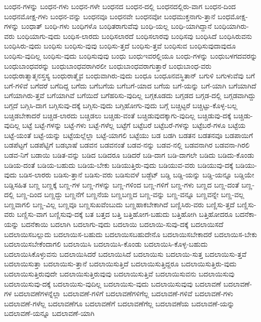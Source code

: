 {ಬಂಧನ-ಗಳನ್ನು
ಬಂಧನ-ಗಳು
ಬಂಧನ-ಗಳೇ
ಬಂಧನದ
ಬಂಧನ-ದಲ್ಲಿ
ಬಂಧನದಲ್ಲಿರು-ವಾಗ
ಬಂಧನ-ದಿಂದ
ಬಂಧನಮೋಕ್ಷ-ಗಳು
ಬಂಧನ-ವನ್ನು
ಬಂಧನವೂ
ಬಂಧನವೇ
ಬಂಧನವೋ
ಬಂಧಮುಕ್ತನಾಗು-ತ್ತಾನೆ
ಬಂಧಮೋಕ್ಷ-ಗಳನ್ನು
ಬಂಧಾತ್
ಬಂಧಿ-ಗಳು
ಬಂಧಿಗಳೊ
ಬಂಧಿತರಾಗುವೆವು
ಬಂಧಿ-ಯಲ್ಲ
ಬಂಧಿ-ಯಾಗಿದ್ದಾನೆ
ಬಂಧಿಯಾಗಿರು-ವರು
ಬಂಧಿಯಾಗು-ವುದು
ಬಂಧಿಸ-ಲಾರದು
ಬಂಧಿಸಲಾರದೆ
ಬಂಧಿಸಲಾರವು
ಬಂಧಿಸವು
ಬಂಧಿಸಿದೆ
ಬಂಧಿಸಿರುವನು
ಬಂಧಿಸಿರು-ವುದು
ಬಂಧಿಸು
ಬಂಧಿಸು-ವುವು
ಬಂಧಿಸು-ತ್ತದೆ
ಬಂಧಿಸು-ತ್ತವೆ
ಬಂಧಿಸುವ
ಬಂಧಿಸುವುದಾವುದೂ
ಬಂಧಿಸು-ವುದಿಲ್ಲ
ಬಂಧಿಸು-ವುದು
ಬಂಧಿಸುವುವು
ಬಂಧು
ಬಂಧುಇವರಲ್ಲಿಯೂ
ಬಂಧು-ಗಳನ್ನು
ಬಂಧುಬಳಗದವರನ್ನು
ಬಂಧುಬಾಂಧವರನ್ನು
ಬಂಧುಬಾಂಧವರಾಗಿರಲೀ
ಬಂಧುಬಾಂಧವರಾಗುತ್ತಾರೆ
ಬಂಧುಬಾಂಧ-ವರು
ಬಂಧುರಾತ್ಮಾತ್ಮನಸ್ತಸ್ಯ
ಬಂಧುರಾತ್ಮೈವ
ಬಂಧುವಾಗಿರು-ವುದು
ಬಂಧೂ
ಬಂಧೂನವಸ್ಥಿತಾನ್
ಬಗುಳಿ
ಬಗುಳುವೆವು
ಬಗೆ
ಬಗೆ-ಗಳಿವೆ
ಬಗೆದರೆ
ಬಗೆದಿದ್ದ
ಬಗೆದು
ಬಗೆಬಗೆಯ
ಬಗೆಬಗೆ-ಯಾದ
ಬಗೆಯ
ಬಗೆ-ಯನ್ನು
ಬಗೆ-ಯಾಗಿ
ಬಗೆಯಾಗಿದೆ
ಬಗೆಯಾಗಿರು-ತ್ತವೆ
ಬಗೆಯಾಗಿವೆ
ಬಗೆಯಿದೆ
ಬಗೆಹರಿಸು-ವುದಿಲ್ಲ
ಬಗ್ಗಕೂಡದು
ಬಗ್ಗಡದ
ಬಗ್ಗಡ-ದಲ್ಲಿ
ಬಗ್ಗಡವಾಗಿದ್ದು
ಬಗ್ಗದೆ
ಬಗ್ಗಿಸಿ-ದಾಗ
ಬಗ್ಗಿಸುವು-ದಕ್ಕೆ
ಬಗ್ಗಿಸು-ವುದು
ಬಗ್ಗಿಹೋಗು-ವುದು
ಬಗ್ಗೆ
ಬಚ್ಚಿಟ್ಟರೆ
ಬಚ್ಚಿಟ್ಟು-ಕೊಳ್ಳ-ಬಲ್ಲ
ಬಚ್ಚಿಡಬೇಕಾದರೆ
ಬಚ್ಚಿಡ-ಲಾರದು
ಬಚ್ಚಿಡಲು
ಬಚ್ಚಿಡು-ವಂತೆ
ಬಚ್ಚಿಡುವುದಕ್ಕಾಗು-ವುದಿಲ್ಲ
ಬಚ್ಚಿಡುವು-ದಕ್ಕೆ
ಬಚ್ಚಿಡು-ವುದಿಲ್ಲ
ಬಟ್ಟೆ
ಬಟ್ಟೆ-ಗಳನ್ನು
ಬಟ್ಟೆ-ಗಳು
ಬಟ್ಟೆ-ಗಳೆಲ್ಲ
ಬಟ್ಟೆಗೆ
ಬಟ್ಟೆಬರೆ
ಬಟ್ಟೆಬರೆ-ಗಳನ್ನು
ಬಟ್ಟೆಬರೆ-ಗಳೂ
ಬಟ್ಟೆಯ
ಬಟ್ಟೆ-ಯಂತೆ
ಬಟ್ಟೆ-ಯನ್ನು
ಬಟ್ಟೆಯಲ್ಲೆಲ್ಲಾ
ಬಟ್ಟೆ-ಯಾಗಲಿ
ಬಟ್ಟೆಯು
ಬಡ
ಬಡಗಿ
ಬಡತನ
ಬಡತನವೂ
ಬಡಪಾಯಿಗೆ
ಬಡಪೆಟ್ಟಗೆ
ಬಡಪೆಟ್ಟಿಗೆ
ಬಡಭಾಷೆ
ಬಡವನ
ಬಡವನಂತೆ
ಬಡವ-ನನ್ನು
ಬಡವ-ನಲ್ಲಿ
ಬಡವನಾಗಿರ
ಬಡವನಾ-ಗಿರಲಿ
ಬಡವ-ನಿಗೆ
ಬಡಾಯಿ
ಬಡಿತ-ವನ್ನು
ಬಡಿದ
ಬಡಿದರೂ
ಬಡಿದರೆ
ಬಡಿ-ದಾಗ
ಬಡಿ-ದಾಗಲೇ
ಬಡಿದು
ಬಡಿದು-ಕೊಂಡು
ಬಡಿಯ-ದಂತೆ
ಬಡಿಯ-ಬಹುದು
ಬಡಿಯ-ಬೇಕು
ಬಡಿಯುತ್ತಿರು-ವುದು
ಬಡಿಯುವ-ವರು
ಬಡಿಯುವು-ದಕ್ಕೆ
ಬಡಿಯು-ವುದು
ಬಡಿಸ-ಲಾರರು
ಬಡಿಸು-ತ್ತಾನೆ
ಬಡಿಸು-ವರು
ಬಡಿಸುವಳೆ
ಬಡ್ಜೆಟ್
ಬಡ್ಡಿ
ಬಡ್ಡಿ-ಯನ್ನು
ಬಡ್ಡಿ-ಯನ್ನೂ
ಬಡ್ಡಿಯೇ
ಬಡ್ಡಿಸಹಿತ
ಬಣ್ಣ
ಬಣ್ಣಕ್ಕೆ
ಬಣ್ಣ-ಗಳ
ಬಣ್ಣ-ಗಳನ್ನು
ಬಣ್ಣ-ಗಳಿಂದ
ಬಣ್ಣ-ಗಳಿಗೆ
ಬಣ್ಣ-ಗಳು
ಬಣ್ಣದ
ಬಣ್ಣ-ದಂತೆ
ಬಣ್ಣ-ದಲ್ಲಿ
ಬಣ್ಣ-ದಿಂದ
ಬಣ್ಣದ್ದು
ಬಣ್ಣನೆಗೆ
ಬಣ್ಣನೆಯ
ಬಣ್ಣಬಣ್ಣದ
ಬಣ್ಣ-ವನ್ನು
ಬಣ್ಣ-ವನ್ನೂ
ಬಣ್ಣವನ್ನೇ
ಬಣ್ಣ-ವಲ್ಲ
ಬಣ್ಣವಾಗಲಿ
ಬಣ್ಣ-ವಿಲ್ಲ
ಬಣ್ಣವೂ
ಬಣ್ಣಸುಖವೆಂಬುದು
ಬಣ್ಣಹಾಕಬೇಕಾಗಿದೆ
ಬಣ್ಣಿಸಿರು-ವರು
ಬಣ್ಣಿಸು-ತ್ತದೆ
ಬಣ್ಣಿಸು-ವರು
ಬಣ್ಣಿಸು-ವಾಗ
ಬಣ್ಣಿಸುವು-ದಕ್ಕೆ
ಬತ
ಬತ್ತದ
ಬತ್ತಿ
ಬತ್ತಿಹೋಗ-ಬಹುದು
ಬತ್ತಿಹೋಗಿ
ಬತ್ತಿಹೋದರೂ
ಬದನೆಕಾ-ಯನ್ನು
ಬದನೆಕಾಯಿ
ಬದಲಾಗಿ
ಬದಲಾಗು-ವುದು
ಬದಲಾಯಿ
ಬದಲಾಯಿ-ಸುವು-ದಕ್ಕೆ
ಬದಲಾಯಿಸದೆ
ಬದಲಾಯಿಸಬಲ್ಲುದು
ಬದಲಾಯಿಸ-ಬಹುದು
ಬದಲಾಯಿಸಬಹುದೇನೊ
ಬದಲಾಯಿಸಬೇಕಾದರೆ
ಬದಲಾಯಿಸ-ಬೇಕು
ಬದಲಾಯಿಸಬೇಕೆಂದಾಗಲಿ
ಬದಲಾಯಿಸಿ
ಬದಲಾಯಿಸಿ-ಕೊಂಡು
ಬದಲಾಯಿಸಿ-ಕೊಳ್ಳ-ಬಹುದು
ಬದಲಾಯಿಸಿಕೊಳ್ಳುವನು
ಬದಲಾಯಿಸಿದರೆ
ಬದಲಾಯಿಸಿದೆ
ಬದಲಾಯಿಸು
ಬದಲಾಯಿ-ಸುತ್ತ
ಬದಲಾಯಿಸು-ತ್ತವೆ
ಬದಲಾಯಿಸುತ್ತಾ
ಬದಲಾಯಿಸು-ತ್ತಾನೆ
ಬದಲಾಯಿಸುತ್ತಿದೆ
ಬದಲಾಯಿಸುತ್ತಿದ್ದರೂ
ಬದಲಾಯಿಸುತ್ತಿರು-ವುದು
ಬದಲಾಯಿಸುತ್ತಿರುವುದೇ
ಬದಲಾಯಿಸುತ್ತಿರುವುವು
ಬದಲಾಯಿಸುತ್ತಿವೆ
ಬದಲಾಯಿಸುವನು
ಬದಲಾಯಿಸುವು
ಬದಲಾಯಿಸುವು-ದಕ್ಕೆ
ಬದಲಾಯಿಸು-ವುದಿಲ್ಲ
ಬದಲಾಯಿಸು-ವುದು
ಬದಲಾಯಿಸುವುವು
ಬದಲಾವಣೆ
ಬದಲಾವಣೆ-ಗಳ
ಬದಲಾವಣೆಗಳನ್ನೆಲ್ಲಾ
ಬದಲಾವಣೆ-ಗಳಿಗೆ
ಬದಲಾವಣೆಗಳಿಗೆಲ್ಲ
ಬದಲಾವಣೆ-ಗಳಿವೆ
ಬದಲಾವಣೆ-ಗಳು
ಬದಲಾವಣೆ-ಗಳೆಲ್ಲ
ಬದಲಾವಣೆಗೂ
ಬದಲಾವಣೆಗೆ
ಬದಲಾವಣೆಗೆಲ್ಲ
ಬದಲಾವಣೆಯ
ಬದಲಾವಣೆ-ಯನ್ನು
ಬದಲಾವಣೆ-ಯನ್ನೂ
ಬದಲಾವಣೆ-ಯಾಗಿ
}
